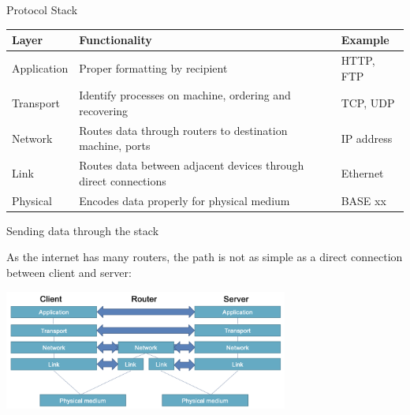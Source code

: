\begin{definition}
    {Protocol Stack}

    \begin{tabular}{|l|l|l|}
        \hline
        \textbf{Layer} & \textbf{Functionality}                                          & \textbf{Example} \\
        \hline
        Application    & Proper formatting by recipient                                  & HTTP, FTP        \\
        \hline
        Transport      & Identify processes on machine, ordering and recovering          & TCP, UDP         \\
        \hline
        Network        & Routes data through routers to destination machine, ports       & IP address       \\
        \hline
        Link           & Routes data between adjacent devices through direct connections & Ethernet         \\
        \hline
        Physical       & Encodes data properly for physical medium                       & BASE xx          \\
        \hline
    \end{tabular}
\end{definition}

\begin{theorem}
    {Sending data through the stack}

    As the internet has many routers, the path is not as simple as a direct connection between client and server:

    \begin{center}
        \includegraphics[width=0.7\textwidth]{./images/m01-l02-1.png}
    \end{center}
\end{theorem}

